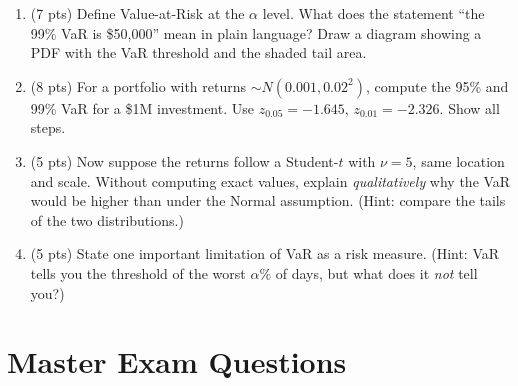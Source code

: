 \documentclass[11pt, a4paper]{article}
\theoremstyle{definition}
\begin{document}
\begin{enumerate}[label=\textbf{Y3-Q\arabic*.}]
\begin{enumerate}[label=(\alph*)]
  \item (7 pts) Define Value-at-Risk at the $\alpha$ level. What does the statement ``the 99\% VaR is \$50{,}000'' mean in plain language? Draw a diagram showing a PDF with the VaR threshold and the shaded tail area.
  \item (8 pts) For a portfolio with returns $\sim N(0.001, 0.02^2)$, compute the 95\% and 99\% VaR for a \$1M investment. Use $z_{0.05} = -1.645$, $z_{0.01} = -2.326$. Show all steps.
  \item (5 pts) Now suppose the returns follow a Student-$t$ with $\nu = 5$, same location and scale. Without computing exact values, explain \textit{qualitatively} why the VaR would be higher than under the Normal assumption. (Hint: compare the tails of the two distributions.)
  \item (5 pts) State one important limitation of VaR as a risk measure. (Hint: VaR tells you the threshold of the worst $\alpha\%$ of days, but what does it \textit{not} tell you?)
\end{enumerate}

\end{enumerate}

\section{Master Exam Questions}
\end{document}
